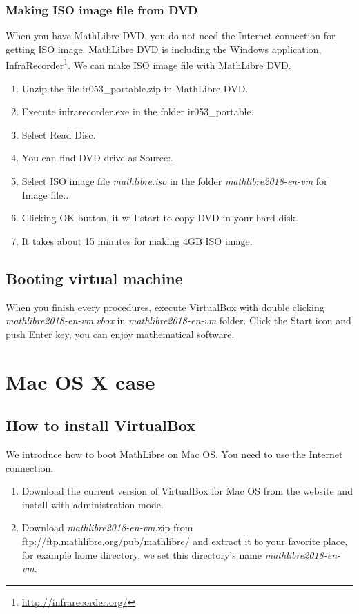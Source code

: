 \documentclass[a4]{article}
\newcommand{\ir}{ir053\_portable}
\newcommand{\vm}{{\em mathlibre2018-en-vm}}
\begin{document}
\subsubsection{Making ISO image file from DVD}
When you have MathLibre DVD, 
you do not need the Internet connection for getting ISO image.
MathLibre DVD is including the Windows application, InfraRecorder\footnote{\url{http://infrarecorder.org/}}.
We can make ISO image file with MathLibre DVD.
\begin{enumerate}
 \item Unzip the file \ir.zip{} in MathLibre DVD.
 \item Execute infrarecorder.exe in the folder \ir.
 \item Select Read Disc.
 \item You can find DVD drive as Source:.
 \item Select ISO image file {\em mathlibre.iso} in the folder \vm{} for Image file:.
 \item Clicking OK button, it will start to copy DVD in your hard disk.
 \item It takes about 15 minutes for making 4GB ISO image.
\end{enumerate}

\subsection{Booting virtual machine}
When you finish every procedures,
execute VirtualBox with double clicking \vm.{\em vbox} in \vm{} folder.
Click the Start icon and push Enter key, you can enjoy mathematical software.

\section{Mac OS X case}
\subsection{How to install VirtualBox}
We introduce how to boot MathLibre on Mac OS.
You need to use the Internet connection.
\begin{enumerate}
 \item Download the current version of VirtualBox for Mac OS from the
       website and install with administration mode.
 \item Download \vm.zip{} from
       \url{ftp://ftp.mathlibre.org/pub/mathlibre/} and extract it to
       your favorite place, for example home directory, we set this
       directory's name \vm.
\end{enumerate}
\end{document}
